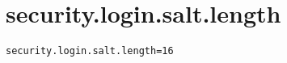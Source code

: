 \section{security.login.salt.length}
\label{configuration:SecurityLoginSaltLength}
\AvailableInJavaOnly{\TODO}
\begin{lstlisting}[style=Props,caption={Usage example for \textit{security.login.salt.length}}]
security.login.salt.length=16
\end{lstlisting}